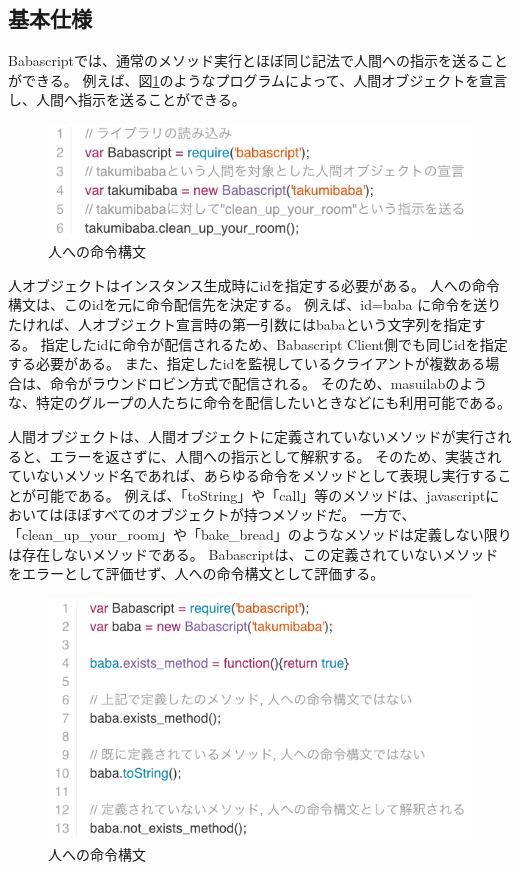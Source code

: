 \subsection{基本仕様}\label{ux57faux672cux4ed5ux69d8}

Babascriptでは、通常のメソッド実行とほぼ同じ記法で人間への指示を送ることができる。
例えば、図\ref{fig:babascript_sample}のようなプログラムによって、人間オブジェクトを宣言し、人間へ指示を送ることができる。

\begin{figure}[htbp]
\begin{center}
\includegraphics[width=.8\linewidth,bb=0 0 563 151]{images/babascript_sample.js.png}
\end{center}
\caption{人への命令構文}
\label{fig:babascript_sample}
\end{figure}

人オブジェクトはインスタンス生成時にidを指定する必要がある。
人への命令構文は、このidを元に命令配信先を決定する。 例えば、id=baba
に命令を送りたければ、人オブジェクト宣言時の第一引数にはbabaという文字列を指定する。
指定したidに命令が配信されるため、Babascript
Client側でも同じidを指定する必要がある。
また、指定したidを監視しているクライアントが複数ある場合は、命令がラウンドロビン方式で配信される。
そのため、masuilabのような、特定のグループの人たちに命令を配信したいときなどにも利用可能である。

人間オブジェクトは、人間オブジェクトに定義されていないメソッドが実行されると、エラーを返さずに、人間への指示として解釈する。
そのため、実装されていないメソッド名であれば、あらゆる命令をメソッドとして表現し実行することが可能である。
例えば、「toString」や「call」等のメソッドは、javascriptにおいてはほぼすべてのオブジェクトが持つメソッドだ。
一方で、「clean\_up\_your\_room」や「bake\_bread」のようなメソッドは定義しない限りは存在しないメソッドである。
Babascriptは、この定義されていないメソッドをエラーとして評価せず、人への命令構文として評価する。

\begin{figure}[htbp]
  \begin{center}
  \includegraphics[width=.8\linewidth,bb=0 0 577 330]{images/methodmissing_sample.js.png}
  \end{center}
  \caption{人への命令構文}
  \label{fig:methodmissing_sample}
\end{figure}

